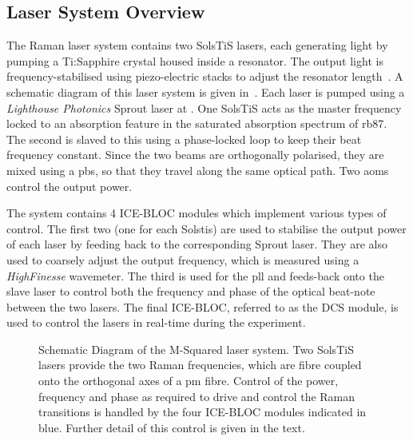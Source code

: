 \subsection{Laser System Overview}
\label{subsec:msquared_overview} The Raman laser system contains two
SolsTiS lasers, each generating  light by pumping a Ti:Sapphire crystal housed inside a resonator.
The output light is frequency-stabilised using piezo-electric stacks to adjust
the resonator length~\cite{Drever1983}. A schematic diagram of this laser system is given
in~. Each laser is pumped using a
 \textit{Lighthouse Photonics} Sprout laser at
. One SolsTiS acts as the master frequency locked
to an absorption feature in the saturated absorption spectrum of
\ac{rb87}. The second is slaved to this using a phase-locked loop to keep their
beat frequency constant. Since the two beams are orthogonally
polarised, they are mixed using a
\ac{pbs}, so that they travel along the same optical path. Two \acp{aom} control the
output power. 
\par\noindent 
The system contains 4 ICE-BLOC modules which implement various types of control. The
first two (one for each Solstis) are used to stabilise the output power of each
laser by feeding back to the corresponding Sprout laser. They are also used to
coarsely adjust the output frequency, which is measured using a
\textit{HighFinesse} wavemeter. The third is used for the \ac{pll}
and feeds-back onto the slave laser to control both the frequency and phase of
the optical beat-note between the two lasers. The final ICE-BLOC, referred to
as the DCS module, is used to control the lasers in real-time during the
experiment.  
\begin{figure}
	\centering \fontsize{10pt}{10pt}
	\resizebox{0.8\textwidth}{!}{}
	\caption[M-Squared Laser System Schematic]{Schematic Diagram of the M-Squared
		laser system. Two SolsTiS lasers provide the two Raman frequencies, which
		are fibre coupled onto the orthogonal axes of a \ac{pm} fibre. Control of
		the power, frequency and phase as required to drive and control
    the Raman transitions is
		handled by the four ICE-BLOC modules indicated in blue. Further detail of
		this control is given in the text.} \label{fig:msquared_laser}
\end{figure}

